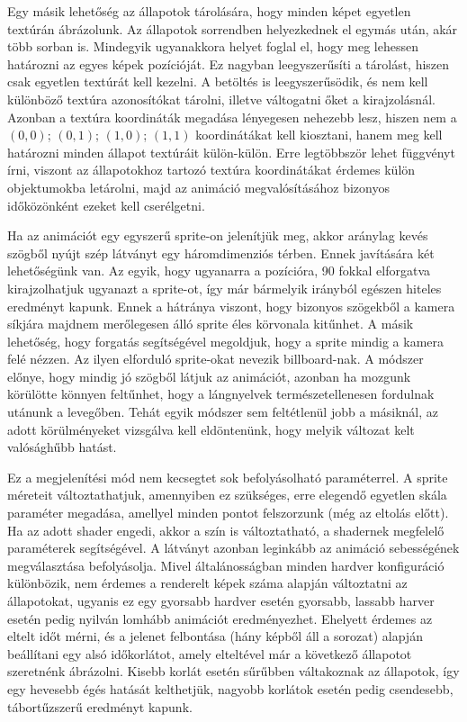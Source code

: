 Egy másik lehetőség az állapotok tárolására, hogy minden képet egyetlen textúrán ábrázolunk. Az állapotok sorrendben helyezkednek el egymás után, akár több sorban is. Mindegyik ugyanakkora helyet foglal el, hogy meg lehessen határozni az egyes képek pozícióját. Ez nagyban leegyszerűsíti a tárolást, hiszen csak egyetlen textúrát kell kezelni. A betöltés is leegyszerűsödik, és nem kell különböző textúra azonosítókat tárolni, illetve váltogatni őket a kirajzolásnál. Azonban a textúra koordináták megadása lényegesen nehezebb lesz, hiszen nem a $(0, 0)$; $(0, 1)$; $(1, 0)$; $(1, 1)$ koordinátákat kell kiosztani, hanem meg kell határozni minden állapot textúráit külön-külön. Erre legtöbbször lehet függvényt írni, viszont az állapotokhoz tartozó textúra koordinátákat érdemes külön objektumokba letárolni, majd az animáció megvalósításához bizonyos időközönként ezeket kell cserélgetni.

Ha az animációt egy egyszerű sprite-on jelenítjük meg, akkor aránylag kevés szögből nyújt szép látványt egy háromdimenziós térben. Ennek javítására két lehetőségünk van. Az egyik, hogy ugyanarra a pozícióra, 90 fokkal elforgatva kirajzolhatjuk ugyanazt a sprite-ot, így már bármelyik irányból egészen hiteles eredményt kapunk. Ennek a hátránya viszont, hogy bizonyos szögekből a kamera síkjára majdnem merőlegesen álló sprite éles körvonala kitűnhet. A másik lehetőség, hogy forgatás segítségével megoldjuk, hogy a sprite mindig a kamera felé nézzen. Az ilyen elforduló sprite-okat nevezik billboard-nak. A módszer előnye, hogy mindig jó szögből látjuk az animációt, azonban ha mozgunk körülötte könnyen feltűnhet, hogy a lángnyelvek természetellenesen fordulnak utánunk a levegőben. Tehát egyik módszer sem feltétlenül jobb a másiknál, az adott körülményeket vizsgálva kell eldöntenünk, hogy melyik változat kelt valósághűbb hatást.

Ez a megjelenítési mód nem kecsegtet sok befolyásolható paraméterrel. A sprite méreteit változtathatjuk, amennyiben ez szükséges, erre elegendő egyetlen skála paraméter megadása, amellyel minden pontot felszorzunk (még az eltolás előtt). Ha az adott shader engedi, akkor a szín is változtatható, a shadernek megfelelő paraméterek segítségével. A látványt azonban leginkább az animáció sebességének megválasztása befolyásolja. Mivel általánosságban minden hardver konfiguráció különbözik, nem érdemes a renderelt képek száma alapján változtatni az állapotokat, ugyanis ez egy gyorsabb hardver esetén gyorsabb, lassabb harver esetén pedig nyilván lomhább animációt eredményezhet. Ehelyett érdemes az eltelt időt mérni, és a jelenet felbontása (hány képből áll a sorozat) alapján beállítani egy alsó időkorlátot, amely elteltével már a következő állapotot szeretnénk ábrázolni. Kisebb korlát esetén sűrűbben váltakoznak az állapotok, így egy hevesebb égés hatását kelthetjük, nagyobb korlátok esetén pedig csendesebb, tábortűzszerű eredményt kapunk.

